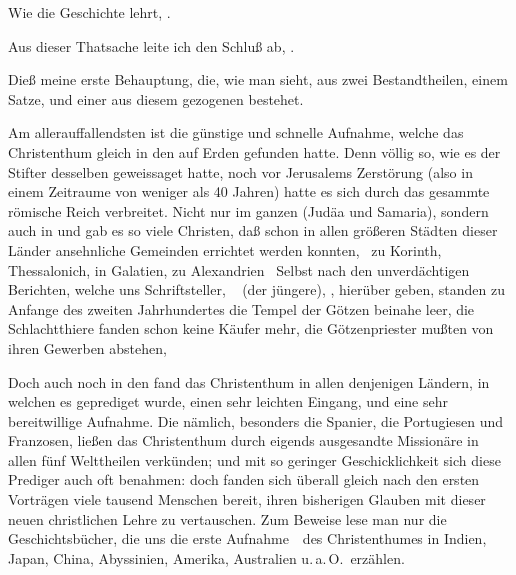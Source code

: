 \begin{aufza}
\item Wie die Geschichte lehrt, .
\item Aus dieser Thatsache leite ich den Schluß ab, .~\ 
\item Dieß meine erste Behauptung, die, wie man sieht, aus zwei Bestandtheilen, einem  Satze, und einer aus diesem gezogenen  bestehet.
\end{aufza}

\begin{aufza}
\item Am allerauffallendsten ist die günstige und schnelle Aufnahme, welche das Christenthum gleich in den  auf Erden gefunden hatte. Denn völlig so, wie es der Stifter desselben geweissaget hatte, noch vor Jerusalems Zerstörung (also in einem Zeitraume von weniger als 40 Jahren) hatte es sich durch das gesammte römische Reich verbreitet. Nicht nur im ganzen  (Judäa und Samaria), sondern auch in  und  gab es so viele Christen, daß schon in allen größeren Städten dieser Länder ansehnliche Gemeinden errichtet werden konnten, \zB\ zu Korinth, Thessalonich, in Galatien, zu Alexandrien \usw\ Selbst nach den unverdächtigen Berichten, welche uns  Schriftsteller, \zB\  (der jüngere),  \uA , hierüber geben, standen zu Anfange des zweiten Jahrhundertes die Tempel der Götzen beinahe leer, die Schlachtthiere fanden schon keine Käufer mehr, die Götzenpriester mußten von ihren Gewerben abstehen, \usw
\item Doch auch noch in den \RWbet{folgenden Jahrhunderten} fand das Christenthum in allen denjenigen Ländern, in welchen es geprediget wurde, einen sehr leichten Eingang, und eine sehr bereitwillige Aufnahme. Die \RWbet{Europäer} nämlich, besonders die Spanier, die Portugiesen und Franzosen, ließen das Christenthum durch eigends ausgesandte Missionäre in allen fünf Welttheilen verkünden; und mit so geringer Geschicklichkeit sich diese Prediger auch oft benahmen: doch fanden sich überall gleich nach den ersten Vorträgen viele tausend Menschen bereit, ihren bisherigen Glauben mit dieser neuen christlichen Lehre zu vertauschen. Zum Beweise lese man nur die Geschichtsbücher, die uns die erste Aufnahme~\RWSeitenw{12}\ des Christenthumes in Indien, Japan, China, Abyssinien, Amerika, Australien u.\,a.\,O.\ erzählen.
\end{aufza}

